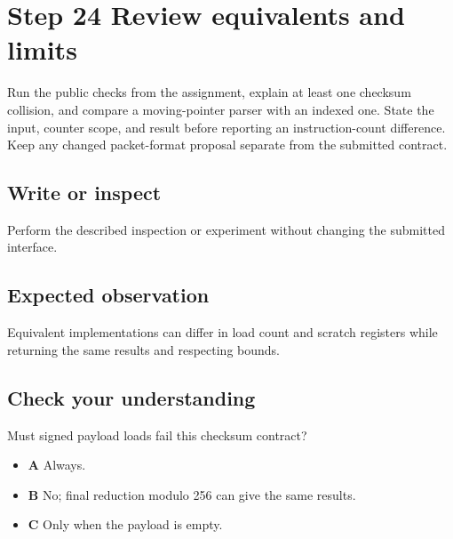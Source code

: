 \section{Step 24 Review equivalents and limits}\label{packet-s24}

Run the public checks from the assignment, explain at least one checksum collision, and compare a moving-pointer parser with an indexed one. State the input, counter scope, and result before reporting an instruction-count difference. Keep any changed packet-format proposal separate from the submitted contract.

\subsection{Write or inspect}
Perform the described inspection or experiment without changing the submitted interface.

\subsection{Expected observation}
Equivalent implementations can differ in load count and scratch registers while returning the same results and respecting bounds.

\subsection{Check your understanding}
Must signed payload loads fail this checksum contract?

\begin{itemize}
  \item \textbf{A} Always.
  \item \textbf{B} No; final reduction modulo 256 can give the same results.
  \item \textbf{C} Only when the payload is empty.
\end{itemize}

